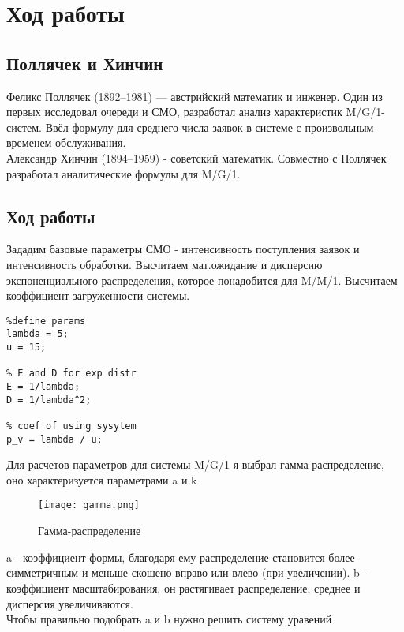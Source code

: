 \chapter{Ход работы}
\label{ch:chap2}

\section{\textbf{Поллячек и Хинчин}}

Феликс Поллячек (1892–1981) — австрийский математик и инженер. Один из первых исследовал очереди и СМО, разработал анализ 
характеристик M/G/1-систем. Ввёл формулу для среднего числа заявок в системе с произвольным временем обслуживания. \\

Александр Хинчин (1894–1959) - советский математик. Совместно с Поллячек разработал аналитические формулы для M/G/1.

\section{\textbf{Ход работы}}

Зададим базовые параметры СМО - интенсивность поступления заявок и интенсивность обработки. Высчитаем мат.ожидание и дисперсию 
экспоненциального распределения, которое понадобится для M/M/1. Высчитаем коэффициент загруженности системы.

\begin{lstlisting}
%define params
lambda = 5;
u = 15;

% E and D for exp distr
E = 1/lambda;
D = 1/lambda^2;

% coef of using sysytem
p_v = lambda / u;
\end{lstlisting}

Для расчетов параметров для системы M/G/1 я выбрал гамма распределение, оно характеризуется параметрами a и k

\begin{figure}[H]
    \centering
    \texttt{[image: gamma.png]}
    \caption{Гамма-распределение}
\end{figure}

a - коэффициент формы, благодаря ему распределение становится более симметричным и меньше скошено вправо или влево (при увеличении).
b - коэффициент масштабирования, он растягивает распределение, среднее и дисперсия увеличиваются. \\

Чтобы правильно подобрать a и b нужно решить систему уравений


